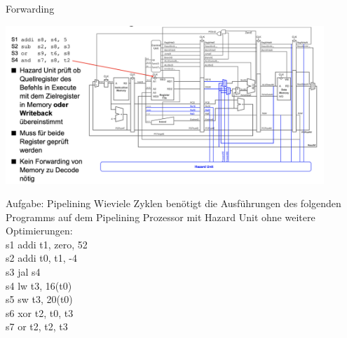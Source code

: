 \documentclass[
  german,            %
  aspectratio=169,    %
]{tumbeamer}
\begin{document}
\begin{frame}[c, fragile]{Forwarding}{}
	\begin{center}
		\includegraphics[width=0.9\textwidth]{w11_forwarding.png}		
	\end{center}
\end{frame}

\begin{frame}[c]{Aufgabe: Pipelining}{}
	Wieviele Zyklen benötigt die Ausführungen des folgenden Programms auf dem Pipelining Prozessor mit Hazard Unit ohne weitere Optimierungen:  \\
	\vspace{0.5cm}
	s1 \hspace{15mm} addi t1, zero, 52 \\
	s2 \hspace{15mm} addi t0, t1, -4    \\
	s3 \hspace{15mm} jal s4    \\
	s4 \hspace{15mm} lw t3, 16(t0)      \\
	s5 \hspace{15mm} sw t3, 20(t0)      \\
	s6 \hspace{15mm} xor t2, t0, t3     \\
	s7 \hspace{15mm} or t2, t2, t3      \\

\end{frame}
\end{document}

